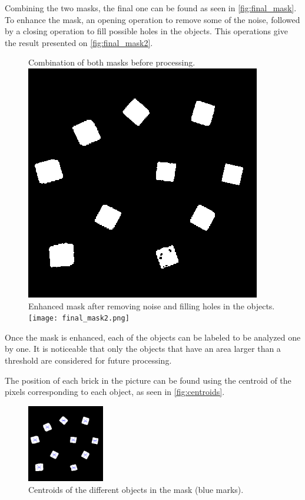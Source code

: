 Combining the two masks, the final one can be found as seen in \autoref{fig:final_mask}. To enhance the mask, an opening operation to remove some of the noise, followed by a closing operation to fill possible holes in the objects. This operations give the result presented on \autoref{fig:final_mask2}.

\begin{figure}[H]
    \captionbox  %
    {
        Combination of both masks before processing.             
        \label{fig:final_mask}                                  
    }                                                                 
    {                                                                  
        \includegraphics[width=.25\textwidth]{figures/final_mask.png}         
    }                                                                    
    \hspace{5pt}                                                          
    \captionbox
    {       
        Enhanced mask after removing noise and filling holes in the objects.
        \label{fig:final_mask2}                                     
    }
    {
        \texttt{[image: final\_mask2.png]}            
    }                                                                             
\end{figure}

Once the mask is enhanced, each of the objects can be labeled to be analyzed one by one. It is noticeable that only the objects that have an area larger than a threshold are considered for future processing.

The position of each brick in the picture can be found using the centroid of the pixels corresponding to each object, as seen in \autoref{fig:centroids}.

\begin{figure}[H]
    \includegraphics[width=0.3\textwidth]{figures/centroids.png}
    \caption{Centroids of the different objects in the mask (blue marks).}
    \label{fig:centroids}
\end{figure}

